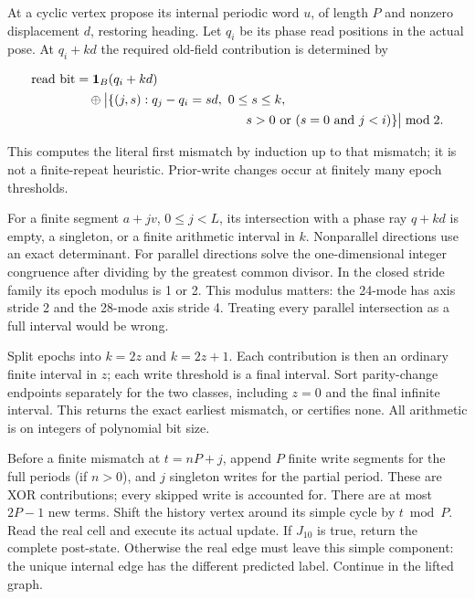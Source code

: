 At a cyclic vertex propose its internal periodic word $u$, of length $P$ and
nonzero displacement $d$, restoring heading. Let $q_i$ be its phase read
positions in the actual pose. At $q_i+kd$ the required old-field
contribution is determined by

\begin{equation}\label{eq:macro4}
\begin{aligned}\text{read bit}&=\mathbf1_B(q_i+kd)\\&\quad\oplus\bigl|\{(j,s):q_j-q_i=sd,\ 0\le s\le k,\\&\hspace{47mm}s>0\ \text{or }(s=0\text{ and }j<i)\}\bigr|\bmod2.\end{aligned}
\end{equation}

This computes the literal first mismatch by induction up to that
mismatch; it is not a finite-repeat heuristic. Prior-write changes occur
at finitely many epoch thresholds.

For a finite segment $a+jv$, $0\le j<L$, its intersection
with a phase ray $q+kd$ is empty, a singleton, or a finite arithmetic
interval in $k$. Nonparallel directions use an exact determinant. For
parallel directions solve the one-dimensional integer congruence after
dividing by the greatest common divisor. In the closed stride family its
epoch modulus is 1 or 2. This modulus matters: the 24-mode has axis
stride 2 and the 28-mode axis stride 4. Treating every parallel
intersection as a full interval would be wrong.

Split epochs into $k=2z$ and $k=2z+1$. Each contribution is then an ordinary
finite interval in $z$; each write threshold is a final interval. Sort
parity-change endpoints separately for the two classes, including $z=0$
and the final infinite interval. This returns the exact earliest
mismatch, or certifies none. All arithmetic is on integers of polynomial
bit size.

Before a finite mismatch at $t=nP+j$, append $P$ finite write segments for
the full periods (if $n>0$), and $j$ singleton writes for the
partial period. These are XOR contributions; every skipped write is
accounted for. There are at most $2P-1$ new terms. Shift the history
vertex around its simple cycle by $t\bmod P$. Read the real cell and
execute its actual update. If $J_{10}$ is true, return the complete
post-state. Otherwise the real edge must leave this simple component:
the unique internal edge has the different predicted label. Continue in
the lifted graph.

